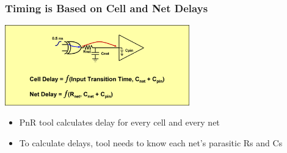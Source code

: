 \documentclass[compress]{beamer}
\begin{document}
\begin{frame}
	\frametitle{Timing is Based on Cell and Net Delays}
	\begin{center}
		\includegraphics[width=0.6\textwidth]{Time}
	\end{center}
	\begin{itemize}
		\item PnR tool calculates delay for every cell and every net
		\item To calculate delays, tool needs to know each net’s parasitic Rs and Cs
	\end{itemize}
\end{frame}
\end{document}
